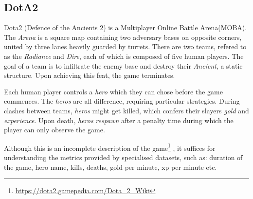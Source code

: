 \documentclass[10pt,a4]{article}
\begin{document}
\subsection{DotA2}

Dota2 (Defence of the Ancients 2) is a Multiplayer Online Battle Arena(MOBA). 
The \emph{Arena} is a square map 
containing two adversary bases on opposite corners, united by three lanes heavily
guarded by turrets. There are two teams, refered to as the \emph{Radiance} and \emph{Dire},
each of which is composed of five human players. The goal of a team is to infiltrate 
the enemy base and destroy their \emph{Ancient}, a static structure. Upon achieving
this feat, the game terminates.

Each human player controls a \emph{hero} which they can chose before the game commences.
The \emph{heros} are all difference, requiring particular strategies. During 
clashes between teams, \emph{heros} might get killed, which confers their slayers
\emph{gold} and \emph{experience}. Upon death, \emph{heros} \emph{respawn} after 
a penalty time during which the player can only observe the game. 

Although this is an incomplete description of the game\footnote{\url{https://dota2.gamepedia.com/Dota_2_Wiki}}
, it suffices for understanding the metrics provided by specialised datasets, such as: 
duration of the game, hero name, kills, deaths, gold per minute, xp per minute etc.














 
\newpage

\end{document}
